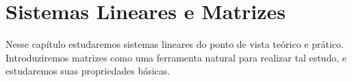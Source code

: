\chapter{Sistemas Lineares e Matrizes}
Nesse capítulo estudaremos sistemas lineares do ponto de vista teórico e prático.
Introduziremos matrizes como uma ferramenta natural para realizar tal estudo, e estudaremos suas propriedades básicas.






